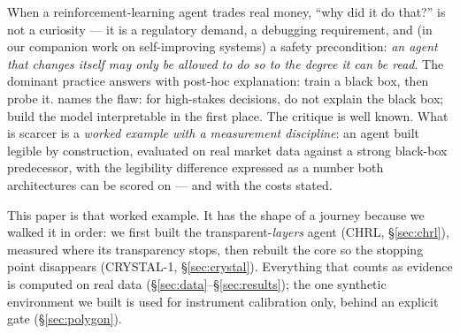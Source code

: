 \documentclass[11pt]{article}
\begin{document}
When a reinforcement-learning agent trades real money, ``why did it do that?'' is not a
curiosity --- it is a regulatory demand, a debugging requirement, and (in our companion work on
self-improving systems) a safety precondition: \emph{an agent that changes itself may only be
allowed to do so to the degree it can be read}. The dominant practice answers with post-hoc
explanation: train a black box, then probe it. \citet{rudin2019} names the flaw: for high-stakes
decisions, do not explain the black box; build the model interpretable in the first place. The
critique is well known. What is scarcer is a \emph{worked example with a measurement
discipline}: an agent built legible by construction, evaluated on real market data against a
strong black-box predecessor, with the legibility difference expressed as a number both
architectures can be scored on --- and with the costs stated.

This paper is that worked example. It has the shape of a journey because we walked it in order:
we first built the transparent-\emph{layers} agent (CHRL, \S\ref{sec:chrl}), measured where its
transparency stops, then rebuilt the core so the stopping point disappears (CRYSTAL-1,
\S\ref{sec:crystal}). Everything that counts as evidence is computed on real data
(\S\ref{sec:data}--\S\ref{sec:results}); the one synthetic environment we built is used for
instrument calibration only, behind an explicit gate (\S\ref{sec:polygon}).
\end{document}
